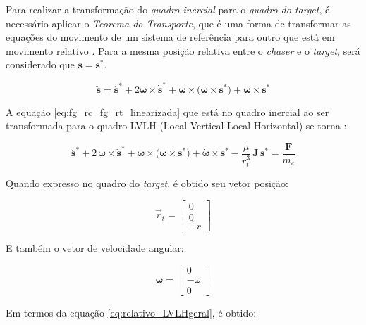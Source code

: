 Para realizar a transformação do \emph{quadro inercial} para o \emph{quadro do target}, é necessário aplicar o \emph{Teorema do Transporte}, que é uma forma de transformar as equações do movimento de um sistema de referência para outro que está em movimento relativo \cite{wie2008space, symon1979}. Para a mesma posição relativa entre o \emph{chaser} e o \emph{target}, será considerado que $\mathbf s = \mathbf s^{*}$.

\begin{equation}
\label{eq:TransporteSymon1979}
\ddot{\mathbf s} = 
\ddot{\mathbf s}^{*}
+ 2\boldsymbol\omega\times\dot{\mathbf s}^{*}
+ \boldsymbol\omega\times\big(\boldsymbol\omega\times\mathbf s^{*}\big)
+ \dot{\boldsymbol\omega}\times\mathbf s^{*}
\end{equation}

A equação \eqref{eq:fg_rc_fg_rt_linearizada} que está no quadro inercial ao ser transformada para o quadro LVLH (Local Vertical Local Horizontal) se torna \cite{fehse2003}:

\begin{equation}
\label{eq:relativo_LVLHgeral}
\ddot{\mathbf s}^{*}
+ 2\,\boldsymbol\omega\times\dot{\mathbf s}^{*}
+ \boldsymbol\omega\times\big(\boldsymbol\omega\times\mathbf s^{*}\big)
+ \dot{\boldsymbol\omega}\times\mathbf s^{*}
- \frac{\mu}{r_t^3}\,\mathbf J\,\mathbf s^{*}
= \frac{\mathbf F}{m_c}
\end{equation}

Quando expresso no quadro do \emph{target}, é obtido seu vetor posição:

\begin{equation}
\label{eq:posicao_LVLH_target}
\vec r_t = \begin{bmatrix} 0 \\ 0 \\ -r \end{bmatrix}
\end{equation}

E também o vetor de velocidade angular:

\begin{equation}
\label{eq:velocidadeAngular_LVLH_target}
\boldsymbol\omega = \begin{bmatrix} 0 \\ -\omega \\ 0
\end{bmatrix}
\end{equation}

Em termos da equação \eqref{eq:relativo_LVLHgeral}, é obtido:

